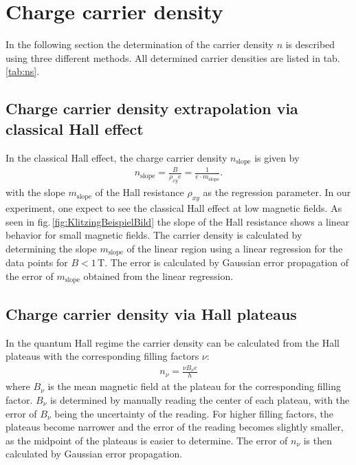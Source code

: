 \section{Charge carrier density}
In the following section the determination of the carrier density $n$ is described using three different methods.
All determined carrier densities are listed in tab.\,\ref{tab:ns}.
\subsection{Charge carrier density extrapolation via classical Hall effect}
In the classical Hall effect, the charge carrier density $n_\text{slope}$ is given by 
\begin{align}
    n_\text{slope} = \frac{B}{\rho_{xy}e} = \frac{1}{e \cdot m_\text{slope}}.
    \label{eq:chargeCarrierClassicalHall}
\end{align}
with the slope $m_\text{slope}$ of the Hall resistance $\rho_{xy}$ as the regression parameter.
In our experiment, one expect to see the classical Hall effect at low magnetic fields.
As seen in fig.\,\ref{fig:KlitzingBeispielBild} the slope of the Hall resistance shows a linear behavior for small magnetic fields.
The carrier density is calculated by determining the slope $m_\text{slope}$ of the linear region using a linear regression for the data points for $B<1\,\text{T}$.
The error is calculated by Gaussian error propagation of the error of $m_\text{slope}$ obtained from the linear regression.

\subsection{Charge carrier density via Hall plateaus}
In the quantum Hall regime the carrier density can be calculated from the Hall plateaus with the corresponding filling factors $\nu$:
\begin{align} 
    n_\nu = \frac{\nu B_\nu e}{h} \label{eq:nnu} 
\end{align} 
where $B_\nu$ is the mean magnetic field at the plateau for the corresponding filling factor.
$B_\nu$ is determined by manually reading the center of each plateau, with the error of $B_\nu$ being the uncertainty of the reading. 
For higher filling factors, the plateaus become narrower and the error of the reading becomes slightly smaller, as the midpoint of the plateaus is easier to determine.
The error of $n_\nu$ is then calculated by Gaussian error propagation.

